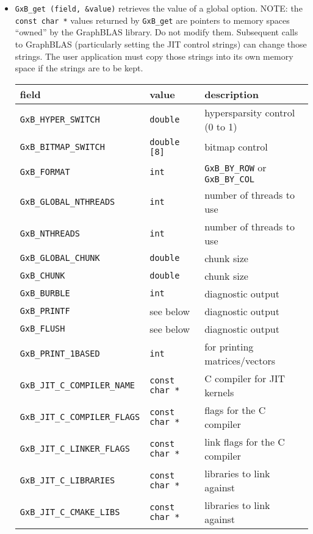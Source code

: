 \documentclass[12pt]{article}
\begin{document}
\begin{itemize}

\item \verb'GxB_get (field, &value)' retrieves the value of a global option.
NOTE: the \verb'const char *' values returned by \verb'GxB_get' are pointers
to memory spaces ``owned'' by the GraphBLAS library.  Do not modify them.
Subsequent calls to GraphBLAS (particularly setting the JIT control strings)
can change those strings.  The user application must copy those strings into
its own memory space if the strings are to be kept.

{\footnotesize
\begin{tabular}{lll}
field                       & value         & description \\
\hline
\verb'GxB_HYPER_SWITCH'     & \verb'double' & hypersparsity control (0 to 1) \\
\verb'GxB_BITMAP_SWITCH'    & \verb'double [8]' & bitmap control \\
\verb'GxB_FORMAT'           & \verb'int'    & \verb'GxB_BY_ROW' or \verb'GxB_BY_COL' \\
\verb'GxB_GLOBAL_NTHREADS'  & \verb'int'    & number of threads to use \\
\verb'GxB_NTHREADS'         & \verb'int'    & number of threads to use \\
\verb'GxB_GLOBAL_CHUNK'     & \verb'double' & chunk size \\
\verb'GxB_CHUNK'            & \verb'double' & chunk size \\
\verb'GxB_BURBLE'           & \verb'int'    & diagnostic output \\
\verb'GxB_PRINTF'           & see below     & diagnostic output \\
\verb'GxB_FLUSH'            & see below     & diagnostic output \\
\verb'GxB_PRINT_1BASED'     & \verb'int'    & for printing matrices/vectors \\
\hline
\verb'GxB_JIT_C_COMPILER_NAME' & \verb'const char *' & C compiler for JIT kernels \\
\verb'GxB_JIT_C_COMPILER_FLAGS'& \verb'const char *' & flags for the C compiler \\
\verb'GxB_JIT_C_LINKER_FLAGS' & \verb'const char *' & link flags for the C compiler \\
\verb'GxB_JIT_C_LIBRARIES'    & \verb'const char *' & libraries to link against \\
\verb'GxB_JIT_C_CMAKE_LIBS'   & \verb'const char *' & libraries to link against \\

\end{tabular}}
\end{itemize}
\end{document}

